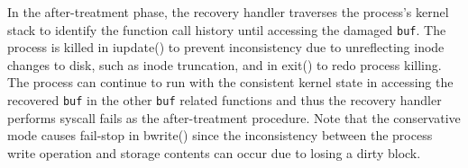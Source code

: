 In the after-treatment phase, the recovery handler traverses the process's kernel stack to identify the function call history until accessing the damaged \texttt{buf}. The process is killed in \textsf{iupdate()} to prevent inconsistency due to unreflecting inode changes to disk, such as inode truncation, and in \textsf{exit()} to redo process killing. The process can continue to run with the consistent kernel state in accessing the recovered \texttt{buf} in the other \texttt{buf} related functions and thus the recovery handler performs syscall fails as the after-treatment procedure. Note that the conservative mode causes fail-stop in \textsf{bwrite()} since the inconsistency between the process write operation and storage contents can occur due to losing a dirty block.


